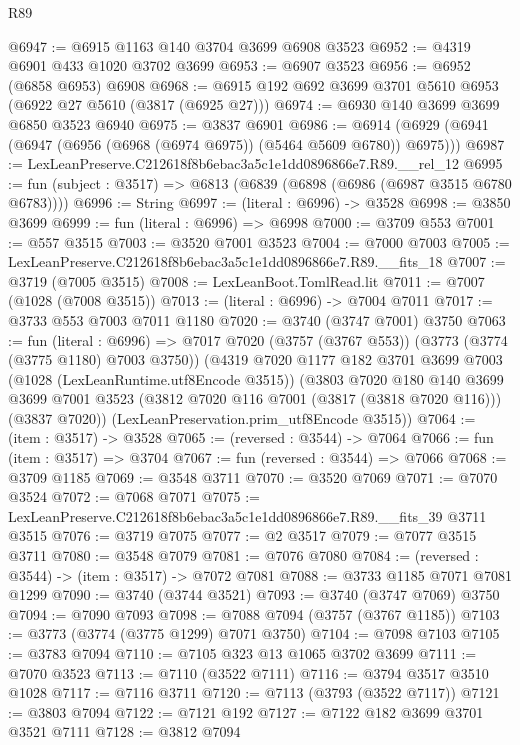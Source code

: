 \begin{lexlean}{R89}
\begin{coremodule}
@6947 := @6915 @1163 @140 @3704 @3699 @6908 @3523
@6952 := @4319 @6901 @433 @1020 @3702 @3699
@6953 := @6907 @3523
@6956 := @6952 (@6858 @6953) @6908
@6968 := @6915 @192 @692 @3699 @3701 @5610 @6953 (@6922 @27 @5610 (@3817 (@6925 @27)))
@6974 := @6930 @140 @3699 @3699 @6850 @3523 @6940
@6975 := @3837 @6901
@6986 := @6914 (@6929 (@6941 (@6947 (@6956 (@6968 (@6974 @6975)) (@5464 @5609 @6780)) @6975)))
@6987 := LexLeanPreserve.C212618f8b6ebac3a5c1e1dd0896866e7.R89.__rel_12
@6995 := fun (subject : @3517) => @6813 (@6839 (@6898 (@6986 (@6987 @3515 @6780 @6783))))
@6996 := String
@6997 := (literal : @6996) -> @3528
@6998 := @3850 @3699
@6999 := fun (literal : @6996) => @6998
@7000 := @3709 @553
@7001 := @557 @3515
@7003 := @3520 @7001 @3523
@7004 := @7000 @7003
@7005 := LexLeanPreserve.C212618f8b6ebac3a5c1e1dd0896866e7.R89.__fits_18
@7007 := @3719 (@7005 @3515)
@7008 := LexLeanBoot.TomlRead.lit
@7011 := @7007 (@1028 (@7008 @3515))
@7013 := (literal : @6996) -> @7004 @7011
@7017 := @3733 @553 @7003 @7011 @1180
@7020 := @3740 (@3747 @7001) @3750
@7063 := fun (literal : @6996) =>
  @7017
    @7020
    (@3757 (@3767 @553))
    (@3773 (@3774 (@3775 @1180) @7003 @3750))
    (@4319
      @7020
      @1177
      @182
      @3701
      @3699
      @7003
      (@1028 (LexLeanRuntime.utf8Encode @3515))
      (@3803
        @7020
        @180
        @140
        @3699
        @3699
        @7001
        @3523
        (@3812 @7020 @116 @7001 (@3817 (@3818 @7020 @116)))
        (@3837 @7020))
      (LexLeanPreservation.prim_utf8Encode @3515))
@7064 := (item : @3517) -> @3528
@7065 := (reversed : @3544) -> @7064
@7066 := fun (item : @3517) => @3704
@7067 := fun (reversed : @3544) => @7066
@7068 := @3709 @1185
@7069 := @3548 @3711
@7070 := @3520 @7069
@7071 := @7070 @3524
@7072 := @7068 @7071
@7075 := LexLeanPreserve.C212618f8b6ebac3a5c1e1dd0896866e7.R89.__fits_39 @3711 @3515
@7076 := @3719 @7075
@7077 := @2 @3517
@7079 := @7077 @3515 @3711
@7080 := @3548 @7079
@7081 := @7076 @7080
@7084 := (reversed : @3544) -> (item : @3517) -> @7072 @7081
@7088 := @3733 @1185 @7071 @7081 @1299
@7090 := @3740 (@3744 @3521)
@7093 := @3740 (@3747 @7069) @3750
@7094 := @7090 @7093
@7098 := @7088 @7094 (@3757 (@3767 @1185))
@7103 := @3773 (@3774 (@3775 @1299) @7071 @3750)
@7104 := @7098 @7103
@7105 := @3783 @7094
@7110 := @7105 @323 @13 @1065 @3702 @3699
@7111 := @7070 @3523
@7113 := @7110 (@3522 @7111)
@7116 := @3794 @3517 @3510 @1028
@7117 := @7116 @3711
@7120 := @7113 (@3793 (@3522 @7117))
@7121 := @3803 @7094
@7122 := @7121 @192
@7127 := @7122 @182 @3699 @3701 @3521 @7111
@7128 := @3812 @7094

\end{coremodule}
\end{lexlean}
